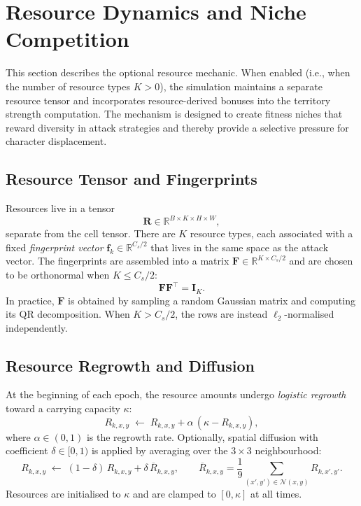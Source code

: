 \documentclass[11pt,a4paper]{article}
\newcommand{\R}{\mathbb{R}}
\newcommand{\Res}{\mathbf{R}}
\newcommand{\fvec}{\mathbf{f}}
\newcommand{\F}{\mathbf{F}}
\theoremstyle{definition}
\begin{document}
\section{Resource Dynamics and Niche Competition}

This section describes the optional resource mechanic. When enabled (i.e., when the number of resource types $K > 0$), the simulation maintains a separate resource tensor and incorporates resource-derived bonuses into the territory strength computation. The mechanism is designed to create fitness niches that reward diversity in attack strategies and thereby provide a selective pressure for character displacement.

\subsection{Resource Tensor and Fingerprints}

Resources live in a tensor
\[
    \Res \in \R^{B \times K \times H \times W},
\]
separate from the cell tensor. There are $K$ resource types, each associated with a fixed \emph{fingerprint vector} $\fvec_k \in \R^{C_s/2}$ that lives in the same space as the attack vector. The fingerprints are assembled into a matrix $\F \in \R^{K \times C_s/2}$ and are chosen to be orthonormal when $K \leq C_s/2$:
\[
    \F\F^\top = \mathbf{I}_K.
\]
In practice, $\F$ is obtained by sampling a random Gaussian matrix and computing its QR decomposition. When $K > C_s/2$, the rows are instead $\ell_2$-normalised independently.

\subsection{Resource Regrowth and Diffusion}

At the beginning of each epoch, the resource amounts undergo \emph{logistic regrowth} toward a carrying capacity $\kappa$:
\[
    R_{k,x,y} \;\leftarrow\; R_{k,x,y} + \alpha\,(\kappa - R_{k,x,y}),
\]
where $\alpha \in (0,1)$ is the regrowth rate. Optionally, spatial diffusion with coefficient $\delta \in [0,1)$ is applied by averaging over the $3\times 3$ neighbourhood:
\[
    R_{k,x,y} \;\leftarrow\; (1 - \delta)\,R_{k,x,y} + \delta\,\overline{R}_{k,x,y},
    \qquad \overline{R}_{k,x,y} = \frac{1}{9}\sum_{(x',y')\in\mathcal{N}(x,y)} R_{k,x',y'}.
\]
Resources are initialised to $\kappa$ and are clamped to $[0, \kappa]$ at all times.
\end{document}
